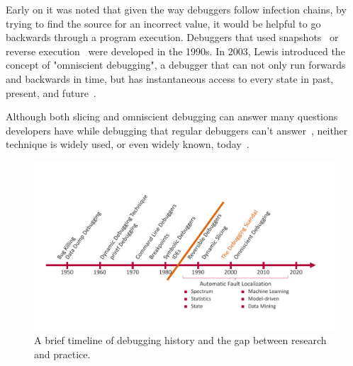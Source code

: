 Early on it was noted that given the way debuggers follow infection chains, by trying to find the source for an incorrect value, it would be helpful to go backwards through a program execution.
Debuggers that used snapshots~\cite{feldman_88_igor_a_system} or reverse execution~\cite{lieberman_95_zstep_95_a_reversible} were developed in the 1990s.
In 2003, Lewis introduced the concept of "omniscient debugging", a debugger that can not only run forwards and backwards in time, but has instantaneous access to every state in past, present, and future~\cite{lewis_03_debugging_backwards_in_time}.

Although both slicing and omniscient debugging can answer many questions developers have while debugging that regular debuggers can't answer~\cite{ko_07_information_needs_in_collocated, storey_97_how_do_program_understanding, sillito_06_questions_programmers_ask}, neither technique is widely used, or even widely known, today~\cite{perscheid_17_studying_the_advancement}.

\begin{figure}[th]
\centering
\includegraphics[width=\linewidth]{img/debugging-timeline}
\caption{A brief timeline of debugging history and the gap between research and practice.}
\label{fig:debugging-timeline}
\end{figure}

